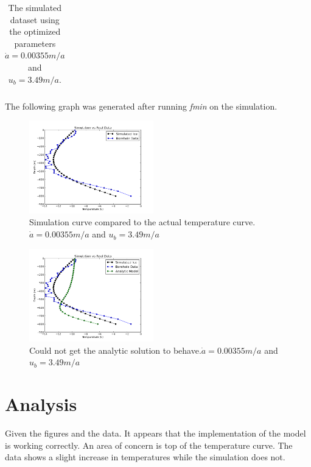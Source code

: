 \documentclass{article}%
\begin{document}
\begin{table}[h!]
\begin{tabular}{c|c}
        \end{tabular}
        \caption{The simulated dataset using the optimized parameters $\dot{a} = 0.00355 m/a$ and $u_b = 3.49 m/a$.}
    \end{table}

    
    The following graph was generated after running {\it fmin} on the simulation. 

    \begin{figure}[h!]
        \centering
        \includegraphics[width=0.48\textwidth]{../img/Simulation_vs_Real.png}
        \caption{Simulation curve compared to the actual temperature curve. $\dot{a} = 0.00355 m/a$ and $u_b = 3.49 m/a$}
    \end{figure}
    
    \begin{figure}[h!]
        \centering
        \includegraphics[width=0.48\textwidth]{../img/bad_analytic.png}
        \caption{Could not get the analytic solution to behave.$\dot{a} = 0.00355 m/a$ and $u_b = 3.49 m/a$}
    \end{figure}

    
    \section{Analysis}
    Given the figures and the data. It appears that the implementation of the model is working correctly. An area of concern is top of the temperature curve. The data shows a slight increase in temperatures while the simulation does not. 
\end{document}
